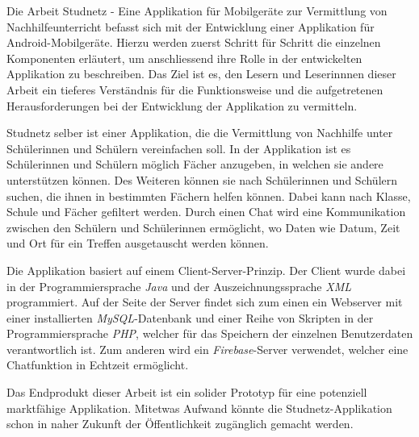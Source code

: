 \documentclass[../main.tex]{subfiles}
\begin{document}
	
	Die Arbeit \glqq Studnetz - Eine Applikation für Mobilgeräte zur Vermittlung von Nachhilfeunterricht\grqq{} befasst sich mit der Entwicklung einer Applikation für Android-Mobilgeräte. Hierzu werden zuerst Schritt für Schritt die einzelnen Komponenten erläutert, um anschliessend ihre Rolle in der entwickelten Applikation zu beschreiben. Das Ziel ist es, den Lesern und Leserinnnen dieser Arbeit ein tieferes Verständnis für die Funktionsweise und die aufgetretenen Herausforderungen bei der Entwicklung der Applikation zu vermitteln.
	
	Studnetz selber ist einer Applikation, die die Vermittlung von Nachhilfe unter Schülerinnen und Schülern vereinfachen soll. In der Applikation ist es Schülerinnen und Schülern möglich Fächer anzugeben, in welchen sie andere unterstützen können. Des Weiteren können sie nach Schülerinnen und Schülern suchen, die ihnen in bestimmten Fächern helfen können. Dabei kann nach Klasse, Schule und Fächer gefiltert werden. Durch einen Chat wird eine Kommunikation zwischen den Schülern und Schülerinnen ermöglicht, wo Daten wie Datum, Zeit und Ort für ein Treffen ausgetauscht werden können.
	
	Die Applikation basiert auf einem Client-Server-Prinzip. Der Client wurde dabei in der Programmiersprache \emph{Java} und der Auszeichnungssprache \emph{XML} programmiert. Auf der Seite der Server findet sich zum einen ein Webserver mit einer installierten \emph{MySQL}-Datenbank und einer Reihe von Skripten in der Programmiersprache \emph{PHP}, welcher für das Speichern der einzelnen Benutzerdaten verantwortlich ist. Zum anderen wird ein \emph{Firebase}-Server verwendet, welcher eine Chatfunktion in Echtzeit ermöglicht.
	
	Das Endprodukt dieser Arbeit ist ein solider Prototyp für eine potenziell marktfähige Applikation. Mitetwas Aufwand könnte die Studnetz-Applikation schon in naher Zukunft der Öffentlichkeit zugänglich gemacht werden.
	
\end{document}

